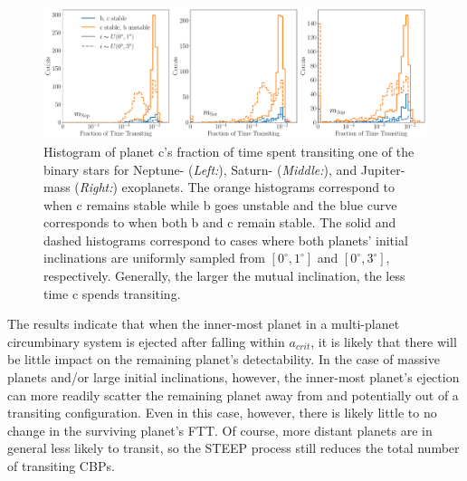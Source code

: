 \begin{figure}[t]
	\includegraphics[width=\columnwidth]{nbody_transit.pdf}
    \caption{Histogram of planet c's fraction of time spent transiting one of the binary stars for Neptune- (\textit{Left:}), Saturn- (\textit{Middle:}), and Jupiter-mass (\textit{Right:}) exoplanets.  The orange histograms correspond to when c remains stable while b goes unstable and the blue curve corresponds to when both b and c remain stable.  The solid and dashed histograms correspond to cases where both planets' initial inclinations are uniformly sampled from $[0^{\circ},1^{\circ}]$ and $[0^{\circ},3^{\circ}]$, respectively.  Generally, the larger the mutual inclination, the less time c spends transiting.}
    \label{STEEP:fig:nbody_transit}
\end{figure}

The results indicate that when the inner-most planet in a multi-planet circumbinary system is ejected after falling within $a_{crit}$, it is likely that there will be little impact on the remaining planet's detectability.  In the case of massive planets and/or large initial inclinations, however, the inner-most planet's ejection can more readily scatter the remaining planet away from and potentially out of a transiting configuration.  Even in this case, however, there is likely little to no change in the surviving planet's FTT.  Of course, more distant planets are in general less likely to transit, so the STEEP process still reduces the total number of transiting CBPs.

